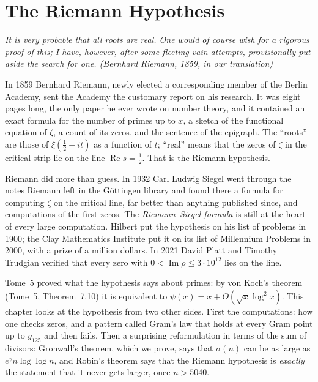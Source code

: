 \chapter{The Riemann Hypothesis}\label{ch:riemann}

\begin{center}\itshape
It is very probable that all roots are real. One would of course wish for a rigorous proof of this; I have, however, after some fleeting vain attempts,
provisionally put aside the search for one.
\upshape(Bernhard Riemann, 1859, in our translation)
\end{center}

In 1859 Bernhard Riemann, newly elected a corresponding member of the Berlin Academy, sent the Academy the customary report on his research. It was
eight pages long, the only paper he ever wrote on number theory, and it contained an exact formula for the number of primes up to $x$, a sketch of
the functional equation of $\zeta$, a count of its zeros, and the sentence of the epigraph. The ``roots'' are those of $\xi(\frac12+it)$ as a function of
$t$; ``real'' means that the zeros of $\zeta$ in the critical strip lie on the line $\operatorname{Re}s=\frac12$. That is the Riemann hypothesis.

Riemann did more than guess. In 1932 Carl Ludwig Siegel went through the notes Riemann left in the G\"ottingen library and found there a formula for
computing $\zeta$ on the critical line, far better than anything published since, and computations of the first zeros. The \emph{Riemann--Siegel
formula} is still at the heart of every large computation. Hilbert put the hypothesis on his list of problems in 1900; the Clay Mathematics Institute
put it on its list of Millennium Problems in 2000, with a prize of a million dollars. In 2021 David Platt and Timothy Trudgian verified that every zero
with $0<\operatorname{Im}\rho\le3\cdot10^{12}$ lies on the line.

Tome~5 proved what the hypothesis says about primes: by von Koch's theorem (Tome~5, Theorem~7.10) it is equivalent to
$\psi(x)=x+O(\sqrt x\log^2x)$. This chapter looks at the hypothesis from two other sides. First the computations: how one checks zeros, and a pattern
called Gram's law that holds at every Gram point up to $g_{125}$ and then fails. Then a surprising reformulation in terms of the sum of divisors: Gronwall's
theorem, which we prove, says that $\sigma(n)$ can be as large as $e^\gamma n\log\log n$, and Robin's theorem says that the Riemann hypothesis is
\emph{exactly} the statement that it never gets larger, once $n>5040$.

